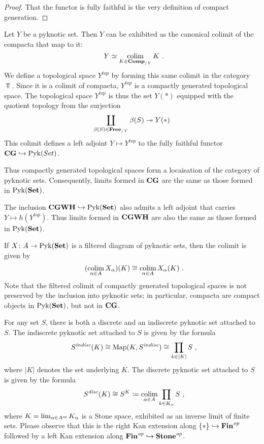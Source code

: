 \begin{proof}
	That the functor is fully faithful is the very definition of compact generation.
\end{proof}

\begin{cnstr}
	Let $ Y $ be a pyknotic set.
	Then $ Y $ can be exhibited as the canonical colimit of the compacta that map to it:
	\[
		Y \simeq \colim_{K \in \Comp_{/Y}} K \period
	\]
	We define a topological space $ Y^{\textit{top}} $ by forming this same colimit in the category $ \Top $.
	Since it is a colimit of compacta, $ Y^{\textit{top}} $ is a compactly generated topological space.
	The topological space $ Y^{\textit{top}} $ is thus the set $ Y(\ast) $ equipped with the quotient topology from the surjection
	\[
		\coprod_{\beta(S) \in \textbf{\textup{Free}}_{/Y}} \beta(S) \twoheadrightarrow Y(\ast)
	\]
	This colimit defines a left adjoint $ Y \mapsto Y^{\textit{top}} $ to the fully faithful functor $ \textbf{\textup{CG}} \hookrightarrow \operatorname{Pyk}(Set) $.

	Thus compactly generated topological spaces form a locaisation of the category of pyknotic sets.
	Consequently, limits formed in $ \textbf{\textup{CG}} $ are the same as those formed in $ \operatorname{Pyk}(\textbf{\textup{Set}}) $.
	
	The inclusion $ \textbf{\textup{CGWH}} \hookrightarrow \operatorname{Pyk}(\textbf{\textup{Set}}) $ also admits a left adjoint that carries $ Y \mapsto h(Y^{\textit{top}}) $.
	Thus limits formed in $ \textbf{\textup{CGWH}} $ are also the same as those formed in $ \operatorname{Pyk}(\textbf{\textup{Set}}) $.
\end{cnstr}

\begin{nul}
	If $ X \colon A \to \operatorname{Pyk}(\textbf{\textup{Set}}) $ is a filtered diagram of pyknotic sets, then the colimit is given by
	\[
		(\colim_{\alpha \in A} X_{\alpha})(K) \cong \colim_{\alpha \in A} X_{\alpha}(K) \period
	\]
	Note that the filtered colimit of compactly generated topological spaces is not preserved by the inclusion into pyknotic sets;
	in particular, compacta are compact objects in $ \operatorname{Pyk}(\textbf{\textup{Set}}) $, but not in $ \textbf{\textup{CG}} $.
\end{nul}

\begin{exm}
	For any set $ S $, there is both a discrete and an indiscrete pyknotic set attached to $ S $.
	The indiscrete pyknotic set attached to $ S $ is given by the formula
	\[
		S^{\indisc}(K) \cong \Map(K, S^{\indisc}) \cong \prod_{k \in |K|} S \comma
	\]
	where $ |K|$ denotes the set underlying $ K $. 
	The discrete pyknotic set attached to $ S $ is given by the formula
	\[
		S^{\disc}(K) \cong S^K \coloneq \colim_{\alpha \in A} \prod_{k \in K_{\alpha}} S \comma
	\]
	where $ K = \lim_{\alpha \in A^{\textit{op}}} K_{\alpha} $ is a Stone space, exhibited as an inverse limit of finite sets.
	Please observe that this is the right Kan extension along $ \{ \ast \} \hookrightarrow \textbf{\textup{Fin}}^{\textit{op}} $ followed by a left Kan extension along $ \textbf{\textup{Fin}}^{\textit{op}} \hookrightarrow \textbf{\textup{Stone}}^{\textit{op}} $.
\end{exm}

